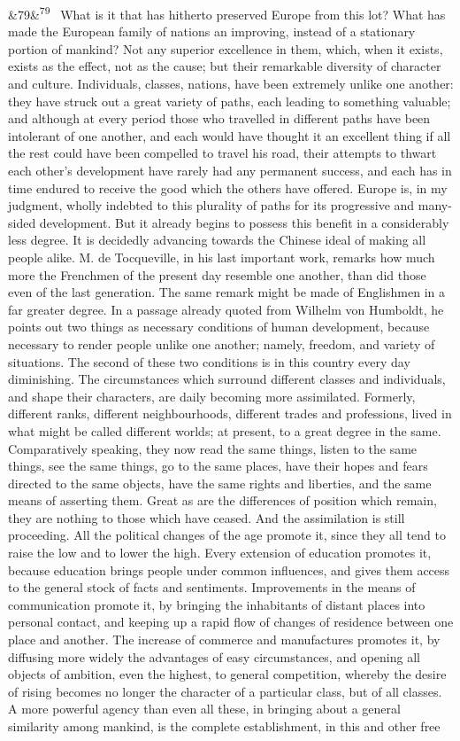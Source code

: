 \documentclass[12pt]{article}
\newcommand{\para}[1][]{\par\noindent\ifx&#1&\else\textsuperscript{\footnotesize #1}~\fi}
\begin{document}
\para[79] What is it that has hitherto preserved Europe from this lot? What has made the European family of nations an improving, instead of a stationary portion of mankind? Not any superior excellence in them, which, when it exists, exists as the effect, not as the cause; but their remarkable diversity of character and culture. Individuals, classes, nations, have been extremely unlike one another: they have struck out a great variety of paths, each leading to something valuable; and although at every period those who travelled in different paths have been intolerant of one another, and each would have thought it an excellent thing if all the rest could have been compelled to travel his road, their attempts to thwart each other's development have rarely had any permanent success, and each has in time endured to receive the good which the others have offered. Europe is, in my judgment, wholly indebted to this plurality of paths for its progressive and many-sided development. But it already begins to possess this benefit in a considerably less degree. It is decidedly advancing towards the Chinese ideal of making all people alike. M. de Tocqueville, in his last important work, remarks how much more the Frenchmen of the present day resemble one another, than did those even of the last generation. The same remark might be made of Englishmen in a far greater degree. In a passage already quoted from Wilhelm von Humboldt, he points out two things as necessary conditions of human development, because necessary to render people unlike one another; namely, freedom, and variety of situations. The second of these two conditions is in this country every day diminishing. The circumstances which surround different classes and individuals, and shape their characters, are daily becoming more assimilated. Formerly, different ranks, different neighbourhoods, different trades and professions, lived in what might be called different worlds; at present, to a great degree in the same. Comparatively speaking, they now read the same things, listen to the same things, see the same things, go to the same places, have their hopes and fears directed to the same objects, have the same rights and liberties, and the same means of asserting them. Great as are the differences of position which remain, they are nothing to those which have ceased. And the assimilation is still proceeding. All the political changes of the age promote it, since they all tend to raise the low and to lower the high. Every extension of education promotes it, because education brings people under common influences, and gives them access to the general stock of facts and sentiments. Improvements in the means of communication promote it, by bringing the inhabitants of distant places into personal contact, and keeping up a rapid flow of changes of residence between one place and another. The increase of commerce and manufactures promotes it, by diffusing more widely the advantages of easy circumstances, and opening all objects of ambition, even the highest, to general competition, whereby the desire of rising becomes no longer the character of a particular class, but of all classes. A more powerful agency than even all these, in bringing about a general similarity among mankind, is the complete establishment, in this and other free 
\end{document}
